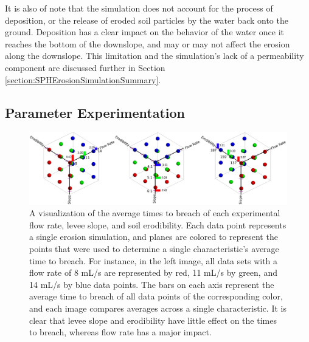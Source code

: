 % 
It is also of note that the simulation does not account for the process of deposition, or the release of eroded soil particles by the water back onto the ground.
Deposition has a clear impact on the behavior of the water once
it reaches the bottom of the downslope, and may or may not affect the
erosion along the downslope.
This limitation and the simulation's lack of a permeability component are discussed further in Section \ref{section:SPHErosionSimulationSummary}.


\subsection{Parameter Experimentation}


\begin{figure}[t]
\begin{minipage}[b]{0.9\linewidth}
\begin{center}
\includegraphics[width=\textwidth]{images/27SimulationsDataPointsFigure.png}
\end{center}
\end{minipage}
\caption[Visualization of average times to breach of 27 simulation results]
{\label{figure:AllDataPointsOfSimulationTests} A visualization of the average times to breach of each experimental flow rate, levee slope, and soil erodibility. Each data point represents a single erosion simulation, and planes are colored to represent the points that were used to determine a single characteristic's average time to breach. For instance, in the left image, all data sets with a flow rate of 8 mL/s are represented by red, 11 mL/s by green, and 14 mL/s by blue data points. The bars on each axis represent the average time to breach of all data points of the corresponding color, and each image compares averages across a single characteristic. It is clear that levee slope and erodibility have little effect on the times to breach, whereas flow rate has a major impact.}
\end{figure}



